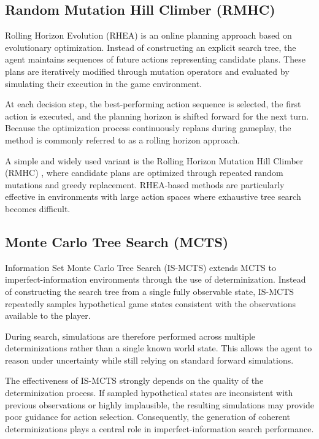 \subsection{Random Mutation Hill Climber (RMHC)}
Rolling Horizon Evolution (RHEA)\cite{perez2018rolling} is an online planning approach based on evolutionary optimization. Instead of constructing an explicit search tree, the agent maintains sequences of future actions representing candidate plans. These plans are iteratively modified through mutation operators and evaluated by simulating their execution in the game environment.

At each decision step, the best-performing action sequence is selected, the first action is executed, and the planning horizon is shifted forward for the next turn. Because the optimization process continuously replans during gameplay, the method is commonly referred to as a rolling horizon approach.

A simple and widely used variant is the Rolling Horizon Mutation Hill Climber (RMHC) \cite{perez2018rolling}, where candidate plans are optimized through repeated random mutations and greedy replacement. RHEA-based methods are particularly effective in environments with large action spaces where exhaustive tree search becomes difficult.

\subsection{Monte Carlo Tree Search (MCTS)}
Information Set Monte Carlo Tree Search (IS-MCTS)\cite{cowling2012information} extends MCTS to imperfect-information environments through the use of determinization. Instead of constructing the search tree from a single fully observable state, IS-MCTS repeatedly samples hypothetical game states consistent with the observations available to the player.

During search, simulations are therefore performed across multiple determinizations rather than a single known world state. This allows the agent to reason under uncertainty while still relying on standard forward simulations.

The effectiveness of IS-MCTS strongly depends on the quality of the determinization process. If sampled hypothetical states are inconsistent with previous observations or highly implausible, the resulting simulations may provide poor guidance for action selection. Consequently, the generation of coherent determinizations plays a central role in imperfect-information search performance.

